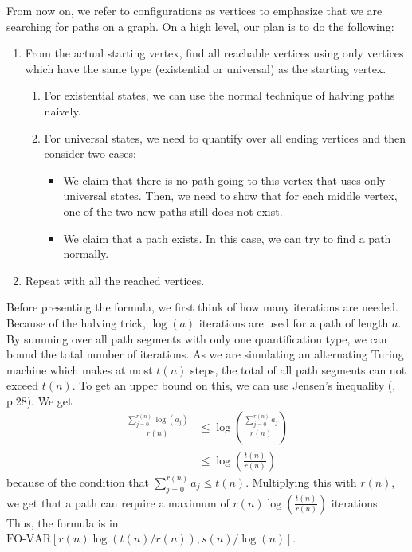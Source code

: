 From now on, we refer to configurations as vertices to emphasize that we are searching for paths on a graph.
On a high level, our plan is to do the following:
\begin{enumerate}
    \setlength\itemsep{0.15em}
    \item From the actual starting vertex, find all reachable vertices using only vertices which have the same type (existential or universal) as the starting vertex.
    \begin{enumerate}
        \item For existential states, we can use the normal technique of halving paths naively.
        \item For universal states, we need to quantify over all ending vertices and then consider two cases:
        \begin{itemize}
            \item We claim that there is no path going to this vertex that uses only universal states.
            Then, we need to show that for each middle vertex, one of the two new paths still does not exist.
            \item We claim that a path exists.
            In this case, we can try to find a path normally.
        \end{itemize}
    \end{enumerate}
    \item Repeat with all the reached vertices.
\end{enumerate}

Before presenting the formula, we first think of how many iterations are needed.
Because of the halving trick,  $\log(a)$ iterations are used for a path of length $a$.
By summing over all path segments with only one quantification type, we can bound the total number of iterations.
As we are simulating an alternating Turing machine which makes at most $t(n)$ steps, the total of all path segments can not exceed $t(n)$.
To get an upper bound on this, we can use Jensen's inequality (\cite{inequalities-math-oly}, p.28).
We get
\[
    \begin{aligned}
        \frac{\sum_{j = 0}^{r(n)}\log(a_{j})}{r(n)} &\leq \log\left(\frac{\sum_{j= 0}^{r(n)}a_{j}}{r(n)} \right)  \\
        &\leq \log\left(\frac{t(n)}{r(n)} \right)
    \end{aligned}
\]
because of the condition that $\sum_{j= 0}^{r(n)}a_{j} \leq t(n)$.
Multiplying this with $r(n)$, we get that a path can require a maximum of $r(n)\log\left(\frac{t(n)}{r(n)} \right)$ iterations.
Thus, the formula is in ${\text{FO-VAR}\left[r(n)\log\left(t(n)/r(n) \right), s(n)/\log(n) \right]}$.


